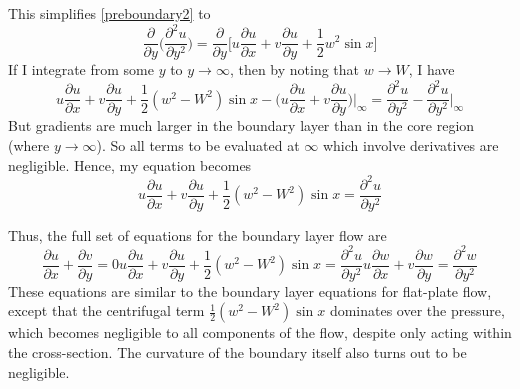 \documentclass[10pt,a4paper]{report}
\begin{document}
This simplifies \eqref{preboundary2} to
\begin{equation*}
\frac{\partial}{\partial y} \bigg(\frac{\partial^2 u}{\partial y^2} \bigg) = \frac{\partial}{\partial y} \bigg[u \frac{\partial u}{\partial x} + v \frac{\partial u}{\partial y} + \frac{1}{2} w^2 \sin x \bigg]
\end{equation*}
If I integrate from some $y$ to $y \rightarrow \infty$, then by noting that $w \rightarrow W$, I have
\begin{equation*}
u \frac{\partial u}{\partial x} + v \frac{\partial u}{\partial y} + \frac{1}{2} \left(w^2 - W^2\right) \sin x - \bigg(u \frac{\partial u}{\partial x} + v \frac{\partial u}{\partial y}\bigg) \bigg|_\infty = \frac{\partial^2 u}{\partial y^2} - \frac{\partial^2 u}{\partial y^2} \bigg|_\infty
\end{equation*}
But gradients are much larger in the boundary layer than in the core region (where $y \rightarrow \infty$). So all terms to be evaluated at $\infty$ which involve derivatives are negligible. Hence, my equation becomes
\begin{equation}
u \frac{\partial u}{\partial x} + v \frac{\partial u}{\partial y} + \frac{1}{2} \left(w^2 - W^2\right) \sin x = \frac{\partial^2 u}{\partial y^2}
\end{equation}

Thus, the full set of equations for the boundary layer flow are
\begin{subequations}
\begin{equation}
\frac{\partial u}{\partial x} + \frac{\partial v}{\partial y} = 0
\end{equation}
\begin{equation}
u \frac{\partial u}{\partial x} + v \frac{\partial u}{\partial y} + \frac{1}{2} \left(w^2 - W^2\right) \sin x = \frac{\partial^2 u}{\partial y^2}
\end{equation}
\begin{equation}
u \frac{\partial w}{\partial x} + v \frac{\partial w}{\partial y} = \frac{\partial ^2 w}{\partial y^2}
\end{equation}
\end{subequations}
These equations are similar to the boundary layer equations for flat-plate flow, except that the centrifugal term $\frac{1}{2} \left(w^2 - W^2\right) \sin x$ dominates over the pressure, which becomes negligible to all components of the flow, despite only acting within the cross-section. The curvature of the boundary itself also turns out to be negligible.
\end{document}
